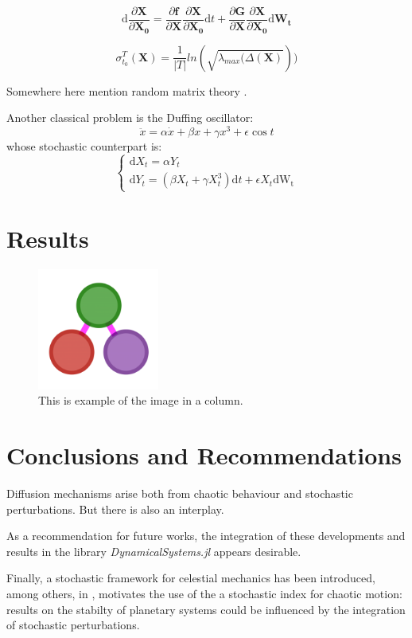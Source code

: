 \documentclass{juliacon}
\newcommand{\drv}{\textrm{d}}
\begin{document}
\begin{equation}
\drv \frac{\partial \mathbf{X}}{\partial \mathbf{X_0}}=
\frac{\partial \mathbf{f}}{\partial \mathbf{X}}
\frac{\partial \mathbf{X}}{\partial \mathbf{X_0}} \drv t
+
\frac{\partial \mathbf{G}}{\partial \mathbf{X}}
\frac{\partial \mathbf{X}}{\partial \mathbf{X_0}} \drv \mathbf{W_t}
\end{equation}

\begin{equation}
    \sigma_{t_0}^T(\mathbf{X})=\frac{1}{|T|}ln(\sqrt{\lambda_{max}(\Delta(\mathbf{X})}))
\end{equation}

Somewhere here mention random matrix theory \cite{potters_bouchaud_2020}.

Another classical problem is the Duffing oscillator:
\begin{equation}
\ddot{x}=\alpha \dot{x}+\beta x+\gamma x^3 + \epsilon\cos{t}
\end{equation}
whose stochastic counterpart is: 
\begin{equation}
    \begin{cases}
    \drv X_t= \alpha Y_t \\
    \drv Y_t = (\beta X_t + \gamma X_t^3)\drv t +\epsilon X_t \drv \mathrm{W_t} 
\end{cases}
\end{equation}


\section{Results}

\begin{figure}[h]
    \centerline{\includegraphics[width=4cm]{juliagraphs.png}}
    \caption{This is example of the image in a column.}
        \label{fig:sample_figure}
    \end{figure}

\section{Conclusions and Recommendations}
Diffusion mechanisms arise both from chaotic behaviour and stochastic perturbations. 
But there is also an interplay.

As a recommendation for future works, the integration of these developments 
and results in the library \textit{DynamicalSystems.jl} appears desirable.

Finally, a stochastic framework for celestial mechanics has been introduced, among others, in \cite{manzibosch}, motivates the use of the a stochastic index for chaotic motion:
results on the stabilty of planetary systems could be influenced by the integration of stochastic perturbations.


\end{document}
